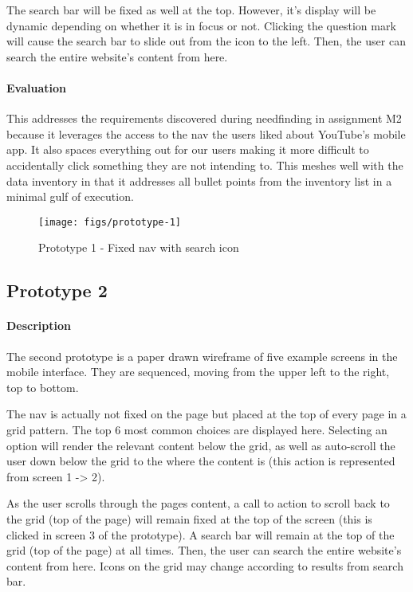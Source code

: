 The search bar will be fixed as well at the top. However, it's display will be dynamic depending on whether it is in focus or not. Clicking the question mark will cause the search bar to slide out from the icon to the left. Then, the user can search the entire website's content from here.

\paragraph{Evaluation} This addresses the requirements discovered during needfinding in assignment M2 because it leverages the access to the nav the users liked about YouTube's mobile app. It also spaces everything out for our users making it more difficult to accidentally click something they are not intending to. This meshes well with the data inventory in that it addresses all bullet points from the inventory list in a minimal gulf of execution.

\begin{figure}[H]
  \centering
  \texttt{[image: figs/prototype-1]}
  \caption{Prototype 1 - Fixed nav with search icon}
  \label{fig::1}
\end{figure}


\subsection{Prototype 2}
\paragraph{Description} The second prototype is a paper drawn wireframe of five example screens in the mobile interface. They are sequenced, moving from the upper left to the right, top to bottom.

The nav is actually not fixed on the page but placed at the top of every page in a grid pattern. The top 6 most common choices are displayed here. Selecting an option will render the relevant content below the grid, as well as auto-scroll the user down below the grid to the where the content is (this action is represented from screen 1 -> 2).

As the user scrolls through the pages content, a call to action to scroll back to the grid (top of the page) will remain fixed at the top of the screen (this is clicked in screen 3 of the prototype). A search bar will remain at the top of the grid (top of the page) at all times. Then, the user can search the entire website's content from here. Icons on the grid may change according to results from search bar.

